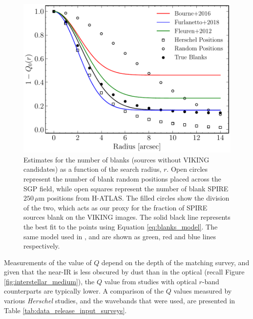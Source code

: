 \begin{figure}
    \centering
	\includegraphics[width=0.67\columnwidth]{Figures/Q_estimate.pdf}
	\caption[An estimate for the number of blank sources as a function of search radius]{Estimates for the number of blanks (sources without VIKING candidates) as a function of the search radius, $r$. Open circles represent the number of blank random positions placed across the SGP field, while open squares represent the number of blank SPIRE $250\,\mu$m positions from H-ATLAS. The filled circles show the division of the two, which acts as our proxy for the fraction of SPIRE sources blank on the VIKING images. The solid black line represents the best fit to the points using Equation \ref{eq:blanks_model}. The same model used in \citealt{Fleuren_2012}, \citealt{Bourne_2016} and \citealt{Furlanetto_2018} are shown as green, red and blue lines respectively.}
	\label{fig:Q_estimate}
\end{figure}

Measurements of the value of $Q$ depend on the depth of the matching survey, and given that the near-IR is less obscured by dust than in the optical (recall Figure \ref{fig:interstellar_medium}), the $Q$ value from studies with optical $r$-band counterparts are typically lower. A comparison of the $Q$ values measured by various \textit{Herschel} studies, and the wavebands that were used, are presented in Table \ref{tab:data_release_input_surveys}.

